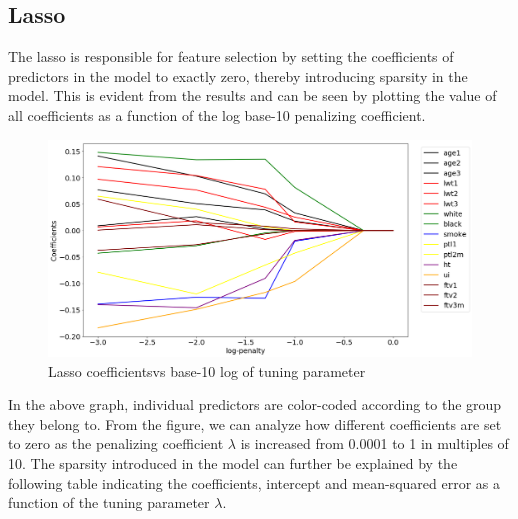 \documentclass[a4paper,12pt]{article}
\begin{document}
		\subsection{Lasso}
		The lasso is responsible for feature selection by setting the coefficients of predictors in the model to exactly zero, thereby introducing sparsity in the model. This is evident from the results and can be seen by plotting the value of all coefficients as a function of the log base-10 penalizing coefficient.
        \begin{figure}[H]
            \centering
            \includegraphics[scale=0.4]{lasso-path.png}
            \caption{Lasso coefficientsvs base-10 log of tuning parameter}
            \label{fig:neurons}
        \end{figure}
        \noindent In the above graph, individual predictors are color-coded according to the group they belong to. From the figure, we can analyze how different coefficients are set to zero as the penalizing coefficient $\lambda$ is increased from 0.0001 to 1 in multiples of 10. The sparsity introduced in the model can further be explained by the following table indicating the coefficients, intercept and mean-squared error as a function of the tuning parameter $\lambda$.
        
        
        
\end{document}
